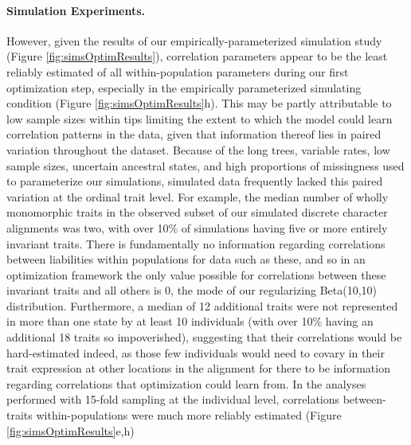 \documentclass[10pt, twocolumn, twoside]{article}
\begin{document}
\paragraph{Simulation Experiments.} However, given the results of our empirically-parameterized simulation study (Figure \ref{fig:simsOptimResults}), correlation parameters appear to be the least reliably estimated of all within-population parameters during our first optimization step, especially in the empirically parameterized simulating condition (Figure \ref{fig:simsOptimResults}h). This may be partly attributable to low sample sizes within tips limiting the extent to which the model could learn correlation patterns in the data, given that information thereof lies in paired variation throughout the dataset. Because of the long trees, variable rates, low sample sizes, uncertain ancestral states, and high proportions of missingness used to parameterize our simulations, simulated data frequently lacked this paired variation at the ordinal trait level. For example, the median number of wholly monomorphic traits in the observed subset of our simulated discrete character alignments was two, with over 10\% of simulations having five or more entirely invariant traits. There is fundamentally no information regarding correlations between liabilities within populations for data such as these, and so in an optimization framework the only value possible for correlations between these invariant traits and all others is 0, the mode of our regularizing Beta(10,10) distribution. Furthermore, a median of 12 additional traits were not represented in more than one state by at least 10 individuals (with over 10\% having an additional 18 traits so impoverished), suggesting that their correlations would be hard-estimated indeed, as those few individuals would need to covary in their trait expression at other locations in the alignment for there to be information regarding correlations that optimization could learn from.  In the analyses performed with 15-fold sampling at the individual level, correlations between-traits within-populations were much more reliably estimated (Figure \ref{fig:simsOptimResults}e,h)
\end{document}
